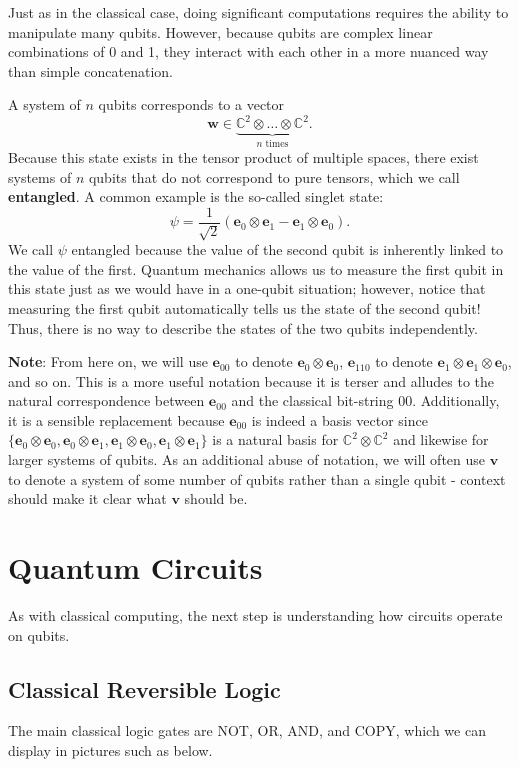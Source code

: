 \documentclass[a4paper]{article}
\newcommand\0{\mathbf{0}}
\newcommand\ee{\mathbf{e}}
\newcommand\vv{\mathbf{v}}
\newcommand\ww{\mathbf{w}}
\newcommand\CC{\mathbb{C}}
\newcommand\<{\langle}
\renewcommand\>{\rangle}
\begin{document}
Just as in the classical case, doing significant computations requires the ability to manipulate many qubits. However, because qubits are complex linear combinations of 0 and 1, they interact with each other in a more nuanced way than simple concatenation. 

A system of $n$ qubits corresponds to a vector 
$$\ww \in \underbrace{\CC^2\otimes \dots\otimes \CC^2}_{n \text{ times}}.$$ Because this state exists in the tensor product of multiple spaces, there exist systems of $n$ qubits that do not correspond to pure tensors, which we call \textbf{entangled}. A common example is the so-called singlet state:
$$\psi = \frac{1}{\sqrt{2}} (\ee_0\otimes \ee_1 - \ee_1\otimes \ee_0). $$
We call $\psi$ entangled because the value of the second qubit is inherently linked to the value of the first. Quantum mechanics allows us to measure the first qubit in this state just as we would have in a one-qubit situation; however, notice that measuring the first qubit automatically tells us the state of the second qubit! Thus, there is no way to describe the states of the two qubits independently.

\textbf{Note}: From here on, we will use $\ee_{00}$ to denote $\ee_{0}\otimes\ee_0$, $\ee_{110}$ to denote $\ee_{1}\otimes\ee_{1}\otimes\ee_0$, and so on. This is a more useful notation because it is terser and alludes to the natural correspondence between $\ee_{00}$ and the classical bit-string $00$. Additionally, it is a sensible replacement because $\ee_{00}$ is indeed a basis vector since $\{\ee_0\otimes\ee_0, \ee_0\otimes\ee_1, \ee_1\otimes\ee_0, \ee_1\otimes\ee_1\}$ is a natural basis for $\CC^2\otimes\CC^2$ and likewise for larger systems of qubits. As an additional abuse of notation, we will often use $\vv$ to denote a system of some number of qubits rather than a single qubit - context should make it clear what $\vv$ should be.

\section{Quantum Circuits}

As with classical computing, the next step is understanding how circuits operate on qubits.

\subsection{Classical Reversible Logic}

The main classical logic gates are NOT, OR, AND, and COPY, which we can display in pictures such as below.
\end{document}
